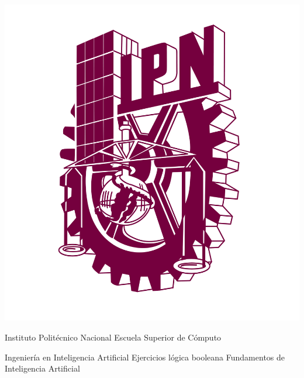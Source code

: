 \thispagestyle{empty}
\begin{center}
    \begin{minipage}[t][4cm][c]{0.20\textwidth}
        \includegraphics[width=\textwidth]{images/ipn_logo.png}
    \end{minipage}
    \begin{minipage}[t][4cm][c]{0.74\textwidth}
        \centering
        \LARGE Instituto Politécnico Nacional
        \vskip 1cm
        \centering
        \LARGE Escuela Superior de Cómputo
    \end{minipage}
    \vskip 3cm
    \textwidth
    \centering \large Ingeniería en Inteligencia Artificial
    \vskip 1cm
    \textwidth
    \centering \LARGE Ejercicios lógica booleana
    \vskip 1cm
\textwidth
    \centering \large Fundamentos de Inteligencia Artificial
\vskip 3cm
\begin{minipage}[b][0.2\textwidth][c]{0.2\textwidth}

\end{minipage}
\end{center}
